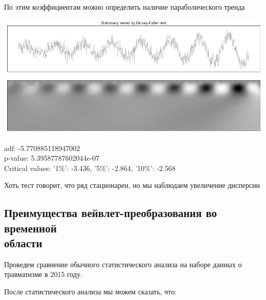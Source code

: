 \documentclass[a4paper]{article}
\begin{document}
	По этим коэффициентам можно определить наличие параболического тренда
	
	\vspace{2em}
	
	\begin{center}
		\includegraphics[scale=0.45]{./output_13_0.png}
		\includegraphics[scale=0.45]{./output_13_1.png}
		
		adf: -5.770885118947002 \\
		p-value: 5.39587787602044e-07 \\
		Critical values: {'1\%': -3.436, '5\%': -2.864, '10\%':
			-2.568}
	\end{center}
	
	Хоть тест говорит, что ряд стационарен, но мы наблюдаем увеличение дисперсии
	
	\subsection{Преимущества вейвлет-преобразования во временной \\ области}
	
	Проведем сравнение обычного статистического анализа на наборе данных о травматизме в 2015 году.
	
	После статистического анализа мы можем сказать, что:
	
\end{document}
